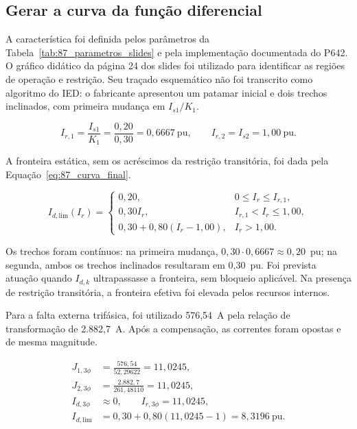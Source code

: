 \subsection{Gerar a curva da função diferencial}

A característica foi definida pelos parâmetros da Tabela~\ref{tab:87_parametros_slides} e pela implementação documentada do P642. O gráfico didático da página 24 dos slides foi utilizado para identificar as regiões de operação e restrição. Seu traçado esquemático não foi transcrito como algoritmo do IED: o fabricante apresentou um patamar inicial e dois trechos inclinados, com primeira mudança em $I_{s1}/K_1$.

\begin{equation}
    I_{r,1}=\frac{I_{s1}}{K_1}
    =\frac{0{,}20}{0{,}30}=0{,}6667~\mathrm{pu},
    \qquad I_{r,2}=I_{s2}=1{,}00~\mathrm{pu}.
    \label{eq:87_ponto_mudanca}
\end{equation}

A fronteira estática, sem os acréscimos da restrição transitória, foi dada pela Equação~\eqref{eq:87_curva_final}.

\begin{equation}
    I_{d,\mathrm{lim}}(I_r)=
    \begin{cases}
        0{,}20, & 0\leq I_r\leq I_{r,1},\\
        0{,}30I_r, & I_{r,1}<I_r\leq1{,}00,\\
        0{,}30+0{,}80(I_r-1{,}00), & I_r>1{,}00.
    \end{cases}
    \label{eq:87_curva_final}
\end{equation}

Os trechos foram contínuos: na primeira mudança, $0{,}30\cdot0{,}6667\approx0{,}20$~pu; na segunda, ambos os trechos inclinados resultaram em 0,30~pu. Foi prevista atuação quando $I_{d,k}$ ultrapassasse a fronteira, sem bloqueio aplicável. Na presença de restrição transitória, a fronteira efetiva foi elevada pelos recursos internos.

Para a falta externa trifásica, foi utilizado 576,54~A pela relação de transformação de 2.882,7~A. Após a compensação, as correntes foram opostas e de mesma magnitude.

\begin{equation}
    \begin{aligned}
        J_{1,3\phi}&=\frac{576{,}54}{52{,}29622}=11{,}0245,\\
        J_{2,3\phi}&=\frac{2.882{,}7}{261{,}48110}=11{,}0245,\\
        I_{d,3\phi}&\approx0,\qquad I_{r,3\phi}=11{,}0245,\\
        I_{d,\mathrm{lim}}&=0{,}30+0{,}80(11{,}0245-1)
        =8{,}3196~\mathrm{pu}.
    \end{aligned}
    \label{eq:87_verificacao_externa}
\end{equation}


